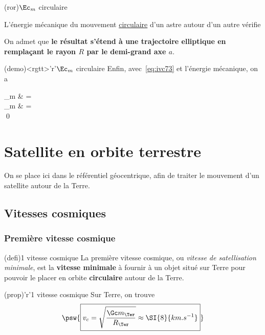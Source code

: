 \documentclass[../../main/main.tex]{subfiles}
\begin{document}
\begin{tcbraster}[raster equal height=rows, raster columns=2]
	\begin{tcb*}(ror){$\Ec_m$ circulaire}
		\begin{bfseries}
			L'énergie mécanique du mouvement \ul{circulaire} d'un astre autour
			d'un autre vérifie
			\psw{\[\boxed{\Ec_{m,\rm cercle} = -\Gc\frac{mM_S}{2R}}\]}
		\end{bfseries}
		\vspace{-15pt}
		\tcblower
		On admet que \textbf{le résultat s'étend à une trajectoire elliptique en
			remplaçant le rayon $R$ par le demi-grand axe $a$}.
	\end{tcb*}
	\begin{tcb*}(demo)<rgtt>'r'{$\Ec_m$ circulaire}
		Enfin, avec~\eqref{eq:ivc73} et l'énergie mécanique, on a
		\begin{DispWithArrows*}[fleqn, mathindent=0pt]
			\Ec_m         & =
			\\\Lra
			\Ec_m         & = 
			\\\Lra
			\qed
		\end{DispWithArrows*}
	\end{tcb*}
\end{tcbraster}

\section{Satellite en orbite terrestre}
On se place ici dans le référentiel géocentrique, afin de traiter le mouvement
d'un satellite autour de la Terre.
\subsection{Vitesses cosmiques}
\subsubsection{Première vitesse cosmique}
\begin{tcbraster}[raster equal height=rows, raster columns=2]
	\begin{tcb*}(defi){1\iere{} vitesse cosmique}
		La première vitesse cosmique, ou \textit{vitesse de satellisation minimale},
		est la \textbf{vitesse minimale} à fournir à un objet situé sur Terre pour
		pouvoir le placer en orbite \textbf{circulaire} autour de la Terre.
	\end{tcb*}
	\begin{tcb*}(prop)'r'{1\iere{} vitesse cosmique}
		Sur Terre, on trouve
		\begin{gather*}
			\psw{
				\boxed{
					v_c = \sqrt{\frac{\Gc m_\Ter}{R_\Ter}} \approx
					\SI{8}{km.s^{-1}}
				}
			}
		\end{gather*}
	\end{tcb*}
\end{tcbraster}
\end{document}
